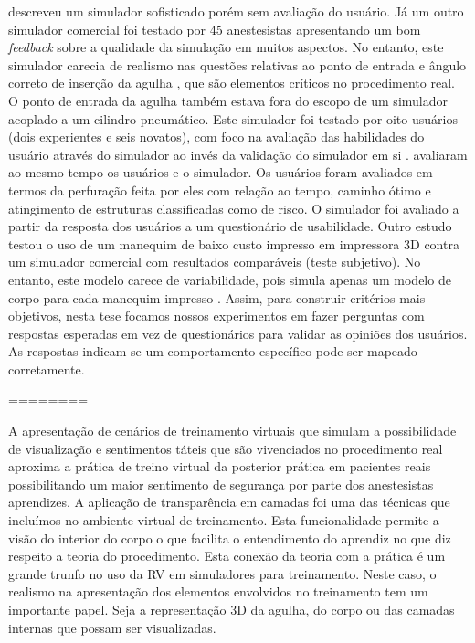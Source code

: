 \textcite{N.2013} descreveu um simulador sofisticado porém sem avaliação do usuário. Já um outro simulador comercial foi testado por 45 anestesistas apresentando um bom \textit{feedback} sobre a qualidade da simulação em muitos aspectos. No entanto, este simulador carecia de realismo nas questões relativas ao ponto de entrada e ângulo correto de inserção da agulha \cite{Lee2012}, que são elementos críticos no procedimento real. O ponto de entrada da agulha também estava fora do escopo de um simulador acoplado a um cilindro pneumático. Este simulador foi testado por oito usuários (dois experientes e seis novatos), com foco na avaliação das habilidades do usuário através do simulador ao invés da validação do simulador em si \cite{Senac2019}. \cite{Farber2009} avaliaram ao mesmo tempo os usuários e o simulador. Os usuários foram avaliados em termos da perfuração feita por eles com relação ao tempo, caminho ótimo e atingimento de estruturas classificadas como de risco. O simulador foi avaliado a partir da resposta dos usuários a um questionário de usabilidade. Outro estudo testou o uso de um manequim de baixo custo impresso em impressora 3D contra um simulador comercial com resultados comparáveis (teste subjetivo). No entanto, este modelo carece de variabilidade, pois simula apenas um modelo de corpo para cada manequim impresso \cite{Mashari2018}. Assim, para construir critérios mais objetivos, nesta tese focamos nossos experimentos em fazer perguntas com respostas esperadas em vez de questionários para validar as opiniões dos usuários. As respostas indicam se um comportamento específico pode ser mapeado corretamente.

========

A apresentação de cenários de treinamento virtuais que simulam a possibilidade de visualização e sentimentos táteis que são vivenciados no procedimento real aproxima a prática de treino virtual da posterior prática em pacientes reais possibilitando um maior sentimento de segurança por parte dos anestesistas aprendizes. A aplicação de transparência em camadas foi uma das técnicas que incluímos no ambiente virtual de treinamento. Esta funcionalidade permite a visão do interior do corpo o que facilita o entendimento do aprendiz no que diz respeito a teoria do procedimento. Esta conexão da teoria com a prática é um grande trunfo no uso da \acrfull{RV} em simuladores para treinamento. Neste caso, o realismo na apresentação dos elementos envolvidos no treinamento tem um importante papel. Seja a representação 3D da agulha, do corpo ou das camadas internas que possam ser visualizadas. 

